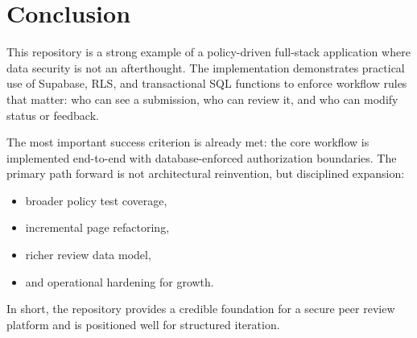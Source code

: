 \documentclass[11pt]{article}
\begin{document}
\section{Conclusion}
This repository is a strong example of a policy-driven full-stack application where data security is not an afterthought. The implementation demonstrates practical use of Supabase, RLS, and transactional SQL functions to enforce workflow rules that matter: who can see a submission, who can review it, and who can modify status or feedback.

The most important success criterion is already met: the core workflow is implemented end-to-end with database-enforced authorization boundaries. The primary path forward is not architectural reinvention, but disciplined expansion:
\begin{itemize}[leftmargin=*]
  \item broader policy test coverage,
  \item incremental page refactoring,
  \item richer review data model,
  \item and operational hardening for growth.
\end{itemize}

In short, the repository provides a credible foundation for a secure peer review platform and is positioned well for structured iteration.

\appendix
\end{document}
